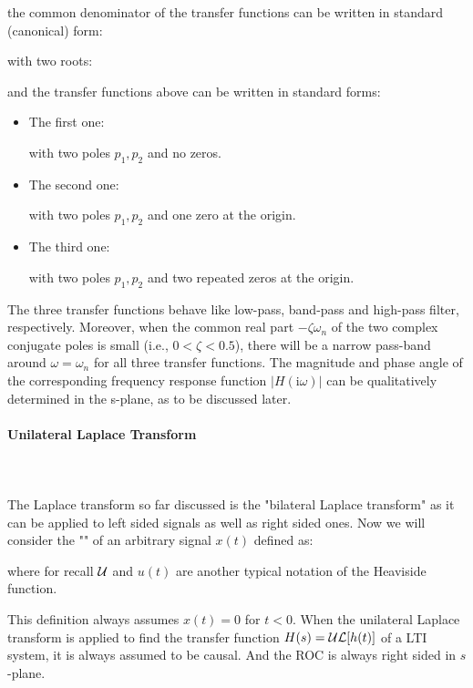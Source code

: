 	the common denominator of the transfer functions can be written in standard (canonical) form:
	
	with two roots:
	
	and the transfer functions above can be written in standard forms:
	\begin{itemize}
		\item The first one:
		
		with two poles $p_1, p_2$ and no zeros.
		 
		\item The second one:
		
		with two poles $p_1, p_2$ and one zero at the origin. 
		
		\item The third one: 
		
		with two poles $p_1, p_2$ and two repeated zeros at the origin. 
	\end{itemize}
	The three transfer functions behave like low-pass, band-pass and high-pass filter, respectively. Moreover, when the common real part $-\zeta \omega_n$ of the two complex conjugate poles is small (i.e., $0<\zeta < 0.5$), there will be a narrow pass-band around $\omega=\omega_n$ for all three transfer functions. The magnitude and phase angle of the corresponding frequency response function $|H(\mathrm{i}\omega)|$ can be qualitatively determined in the s-plane, as to be discussed later.
	
	\paragraph{Unilateral Laplace Transform}\label{unilateral Laplace transform}\mbox{}\\\\
	The Laplace transform so far discussed is the "bilateral Laplace transform" as it can be applied to left sided signals as well as right sided ones. Now we will consider the "" of an arbitrary signal $x(t)$ defined as:
	
	where for recall $\cal U$ and $u(t)$ are another typical notation of the Heaviside function.
	
	This definition always assumes $x(t)=0$ for $t<0$. When the unilateral Laplace transform is applied to find the transfer function $H(s)={\cal UL}[h(t)]$ of a LTI system, it is always assumed to be causal. And the ROC is always right sided in $s$-plane.
	
